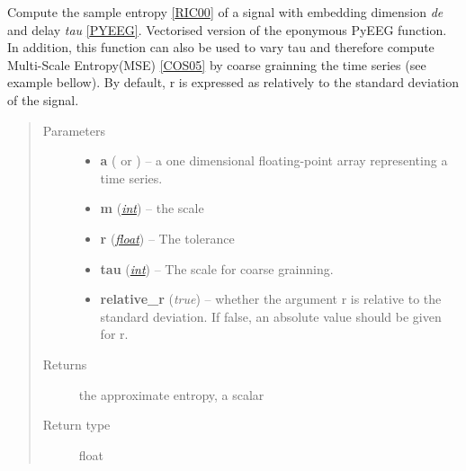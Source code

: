 \documentclass[letterpaper,10pt,english]{sphinxmanual}
\begin{document}

\begin{fulllineitems}
\label{pyrem.univariate:pyrem.univariate.samp_entropy}
Compute the sample entropy {\hyperref[pyrem.univariate:ric00]{{[}RIC00{]}}} of a signal with embedding dimension \emph{de} and delay \emph{tau} {\hyperref[pyrem.univariate:pyeeg]{{[}PYEEG{]}}}.
Vectorised version of the eponymous PyEEG function.
In addition, this function can also be used to vary tau and therefore compute Multi-Scale Entropy(MSE) {\hyperref[pyrem.univariate:cos05]{{[}COS05{]}}} by
coarse grainning the time series (see example bellow).
By default, r is expressed as relatively to the standard deviation of the signal.
\begin{quote}\begin{description}
\item[{Parameters}] \leavevmode\begin{itemize}
\item {} 
\textbf{a} (\href{http://docs.scipy.org/doc/numpy/reference/generated/numpy.ndarray.html\#numpy.ndarray}{} or {\hyperref[pyrem.time_series:pyrem.time_series.Signal]{}}) -- a one dimensional floating-point array representing a time series.

\item {} 
\textbf{m} (\href{http://docs.python.org/2.7/library/functions.html\#int}{\emph{int}}) -- the scale

\item {} 
\textbf{r} (\href{http://docs.python.org/2.7/library/functions.html\#float}{\emph{float}}) -- The tolerance

\item {} 
\textbf{tau} (\href{http://docs.python.org/2.7/library/functions.html\#int}{\emph{int}}) -- The scale for coarse grainning.

\item {} 
\textbf{relative\_r} (\emph{true}) -- whether the argument r is relative to the standard deviation. If false, an absolute value should be given for r.

\end{itemize}

\item[{Returns}] \leavevmode
the approximate entropy, a scalar

\item[{Return type}] \leavevmode
float


\end{description}
\end{quote}
\end{fulllineitems}
\end{document}
